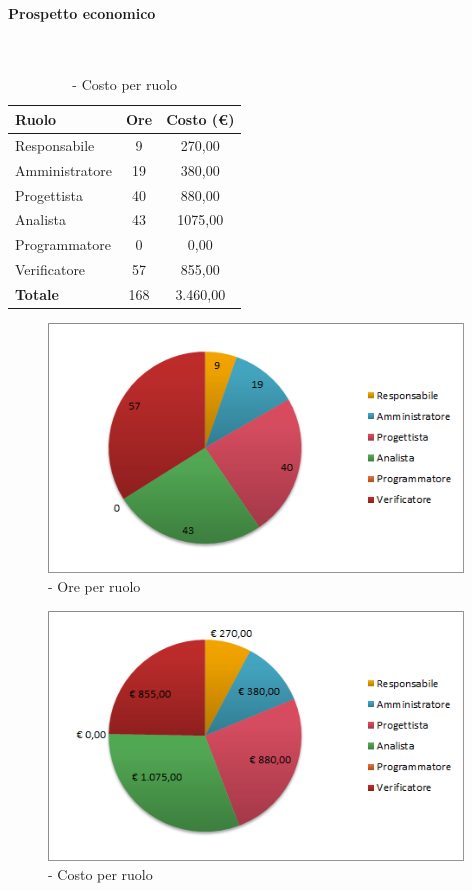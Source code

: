 \documentclass[./PianoDiProgetto.tex]{subfiles}
\begin{document}
	\paragraph{Prospetto economico}\

	\begin{table}[H]
		\centering

		\begin{tabular}{l * {2}{c}}
			\toprule
			\textbf{Ruolo} & \textbf{Ore} & \textbf{Costo (\euro{})} \\
			\midrule
			Responsabile & 9    &  270,00 \\
			Amministratore  & 19     &  380,00 \\
			Progettista  & 40    &  880,00 \\
			Analista & 43   &  1075,00 \\
			Programmatore  & 0    &  0,00 \\
			Verificatore  & 57    &  855,00 \\
			\midrule
			\textbf{Totale}  & 168   &  3.460,00 \\
			\bottomrule
		\end{tabular}
		\caption{\PerPD{} - Costo per ruolo}

	\end{table}
\vfill
\newpage
\vfill

	\begin{figure}[H]
		\centering
		\includegraphics[width=11cm, trim=1cm 0cm 1cm 0cm]{grafici/Pd-ruolo}
			\caption{\PerPD{}- Ore per ruolo}

	\end{figure}

\vfill
	\begin{figure}[H]
		\centering
		\includegraphics[width=11cm, trim=1cm 0cm 1cm 0cm]{grafici/Pd-costo}
			\caption{\PerPD{} - Costo per ruolo}
	\end{figure}
\vfill
\newpage
\end{document}
